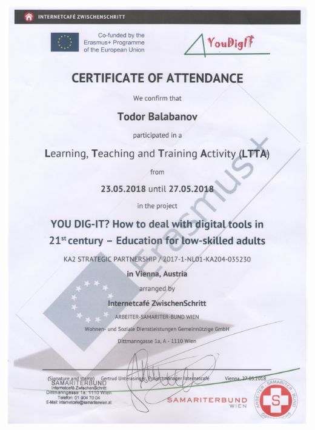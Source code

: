 \documentclass[bulgarian,a4paper]{europasscv}
\begin{document}
\includegraphics[width=\textwidth,height=\textheight,keepaspectratio]{YouDigIT2018}
\end{document}
